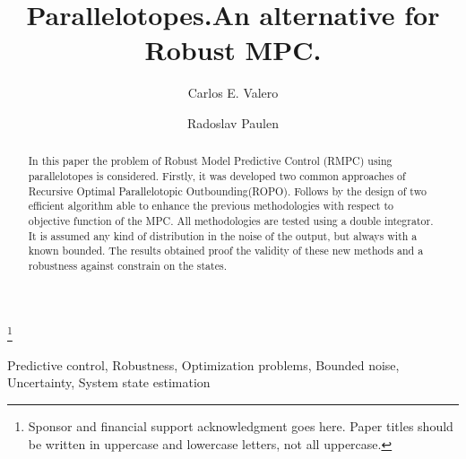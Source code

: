 \documentclass{ifacconf}
\begin{document}
\begin{frontmatter}

\title{Parallelotopes.An alternative for Robust MPC.}

\thanks[footnoteinfo]{Sponsor and financial support acknowledgment
goes here. Paper titles should be written in uppercase and lowercase
letters, not all uppercase.}

\author[First]{Carlos E. Valero} 
\author[First]{Radoslav Paulen} 

\address[First]{Slovak University of Technology in Bratislava, Slovakia,
(e-mail: \{carlos.valero, radoslav.paulen\}@stuba.sk).}

\begin{abstract}                %
In this paper the problem of Robust Model Predictive Control (RMPC) using parallelotopes is considered. Firstly, it was developed two common approaches of Recursive Optimal Parallelotopic Outbounding(ROPO). Follows by the design of two efficient algorithm able to enhance the previous methodologies with respect to objective function of the MPC. All methodologies are tested using a double integrator. It is assumed any kind of distribution in the noise of the output, but always with a known bounded. The results obtained proof the validity of these new methods and a robustness against constrain on the states. 
\end{abstract}

\begin{keyword}
Predictive control, Robustness, Optimization problems, Bounded noise, Uncertainty, System state estimation

\end{keyword}

\end{frontmatter}
\end{document}
